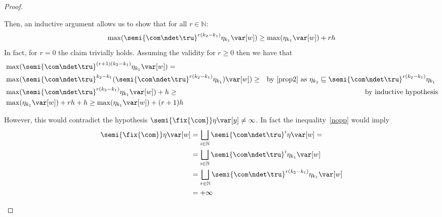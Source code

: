 \begin{proof}
\begin{inductive}
    \noindent    
    Then, an inductive argument allows us to show that for all \(r \in \mathbb{N}\):
    \begin{equation}\label{nopp}
      \max(\semi{\com \ndet \tru}^{r(k_2-k_1)} \eta_{k_1} \var[w]) \geq \max(\eta_{k_1}
      \var[w]) + r h
    \end{equation}  
    In fact, for \(r=0\) the claim trivially holds. Assuming the
    validity for \(r\geq 0\) then we have that
    \begin{align*}    
      & \max(\semi{\com \ndet \tru}^{(r+1)(k_2-k_1)} \eta_{k_1} \var[w]) =\\
      &\max(\semi{\com \ndet \tru}^{k_2-k_1} ( \semi{\com \ndet \tru}^{r(k_2-k_1)} \eta_{k_1}) \var[w]) \geq & \mbox{by \eqref{prop2} as \(\eta_{k_1} \sqsubseteq \semi{\com \ndet \tru}^{r(k_2-k_1)} \eta_{k_1}\) }\\
      &\max(\semi{\com \ndet \tru}^{r(k_2-k_1)} \eta_{k_1} \var[w]) + h \geq & \mbox{by inductive hypothesis}\\
      &  \max(\eta_{k_1}\var[w])  + rh + h
        \geq 
        \max(\eta_{k_1}\var[w])  + (r+1)h
    \end{align*}

    \noindent
    However, this would contradict the hypothesis
    \(\semi{\fix{\com}} \eta \var[y] \neq \infty\). In fact the
    inequality~\eqref{nopp} would imply
    \begin{align*}
      \semi{\fix{\com}} \eta \var[w]
      & = \bigsqcup_{i \in \mathbb{N}} \semi{\com
        \ndet \tru}^i \eta \var[w] =\\ 
      & =  \bigsqcup_{i \in \mathbb{N}} \semi{\com \ndet
        \tru}^i \eta_{k_1} \var[w]\\ 
      & = \bigsqcup_{r \in \mathbb{N}} \semi{\com \ndet
        \tru}^{r(k_2-k_1)} \eta_{k_1} \var[w]\\
      & = +\infty
    \end{align*}


\end{inductive}
\end{proof}
